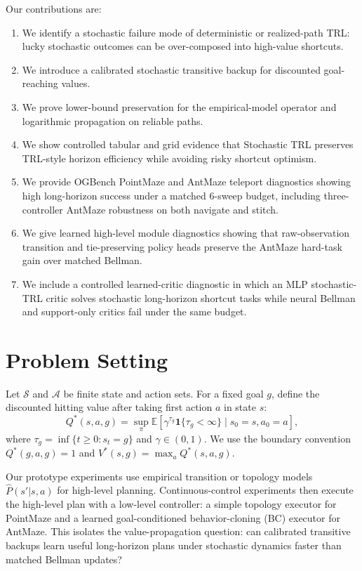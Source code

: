 \documentclass[10pt]{article}
\newcommand{\states}{\mathcal{S}}
\newcommand{\actions}{\mathcal{A}}
\newcommand{\E}{\mathbb{E}}
\newcommand{\Phat}{\widehat{P}}
\newcommand{\one}{\mathbf{1}}
\begin{document}
Our contributions are:
\begin{enumerate}[leftmargin=1.5em]
    \item We identify a stochastic failure mode of deterministic or
    realized-path TRL: lucky stochastic outcomes can be over-composed into
    high-value shortcuts.
    \item We introduce a calibrated stochastic transitive backup for
    discounted goal-reaching values.
    \item We prove lower-bound preservation for the empirical-model operator
    and logarithmic propagation on reliable paths.
    \item We show controlled tabular and grid evidence that Stochastic TRL
    preserves TRL-style horizon efficiency while avoiding risky shortcut
    optimism.
    \item We provide OGBench PointMaze and AntMaze teleport diagnostics showing
    high long-horizon success under a matched 6-sweep budget, including
    three-controller AntMaze robustness on both navigate and stitch.
    \item We give learned high-level module diagnostics showing that
    raw-observation transition and tie-preserving policy heads preserve the
    AntMaze hard-task gain over matched Bellman.
    \item We include a controlled learned-critic diagnostic in which an MLP
    stochastic-TRL critic solves stochastic long-horizon shortcut tasks while
    neural Bellman and support-only critics fail under the same budget.
\end{enumerate}

\section{Problem Setting}

Let $\states$ and $\actions$ be finite state and action sets. For a fixed goal
$g$, define the discounted hitting value after taking first action $a$ in
state $s$:
\begin{equation}
Q^*(s,a,g)
= \sup_\pi \E\left[\gamma^{\tau_g}\one\{\tau_g < \infty\}
    \mid s_0=s, a_0=a\right],
\end{equation}
where $\tau_g=\inf\{t\geq 0:s_t=g\}$ and $\gamma\in(0,1)$. We use the boundary
convention $Q^*(g,a,g)=1$ and $V^*(s,g)=\max_a Q^*(s,a,g)$.

Our prototype experiments use empirical transition or topology models
$\Phat(s'|s,a)$ for high-level planning. Continuous-control experiments then
execute the high-level plan with a low-level controller: a simple topology
executor for PointMaze and a learned goal-conditioned behavior-cloning (BC)
executor for AntMaze. This isolates the value-propagation question: can
calibrated transitive backups learn useful long-horizon plans under stochastic
dynamics faster than matched Bellman updates?
\end{document}
